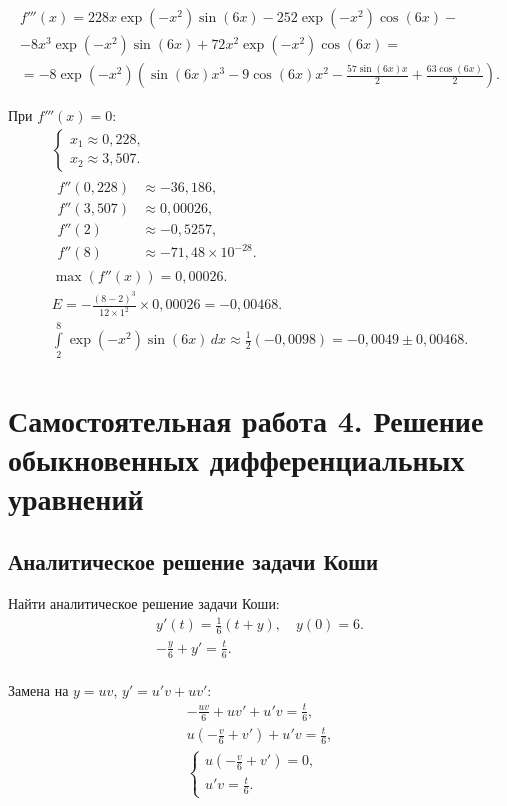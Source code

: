 \documentclass[10pt, a4paper, titlepage]{article}
\begin{document}
\begin{multline*}
    f'''(x)=228x\exp(-x^2)\sin(6x)-252\exp(-x^2)\cos(6x)- \\
    -8x^3\exp(-x^2)\sin(6x)+72x^2\exp(-x^2)\cos(6x) = \\
    = -8\exp(-x^2)\left(\sin(6x)x^3-9\cos(6x)x^2-\frac{57\sin(6x)x}{2}+\frac{63\cos(6x)}{2}\right) .
\end{multline*}

При $f'''(x) = 0$:
\begin{gather*}
    \begin{cases}
        x_1 \approx 0,228 ,\\
        x_2 \approx 3,507 .
    \end{cases} 
    \\
    \begin{aligned}
        f''(0,228) &\approx -36,186 ,\\
        f''(3,507) &\approx 0,00026 ,\\
        f''(2) &\approx -0,5257 ,\\
        f''(8) &\approx -71,48\times10^{-28} .
    \end{aligned}
    \\
    \max(f''(x))=0,00026 .\\
    E=-\frac{(8-2)^3}{12\times1^2}\times0,00026=-0,00468 .\\
    \int\limits_2^8 \exp(-x^2)\sin(6x)\,dx \approx \frac{1}{2}(-0,0098)=-0,0049\pm0,00468 .
\end{gather*}


\clearpage
\section{Самостоятельная работа \textnumero{} 4. Решение обыкновенных дифференциальных уравнений}

\subsection*{Аналитическое решение задачи Коши}

Найти аналитическое решение задачи Коши:
\begin{gather*}
    y'(t)=\frac{1}{6}(t+y), \quad y(0)=6 .\\
    -\frac{y}{6}+y'=\frac{t}{6} .\\
\end{gather*}

Замена на $y=uv$, $y'=u'v+uv'$:
\begin{gather*}
    -\frac{uv}{6}+uv'+u'v=\frac{t}{6} ,\\
    u\left(-\frac{v}{6}+v'\right)+u'v = \frac{t}{6} ,\\
    \begin{cases}
        u\left(-\frac{v}{6}+v'\right)=0 ,\\
        u'v=\frac{t}{6} .
    \end{cases}
\end{gather*}
\end{document}
